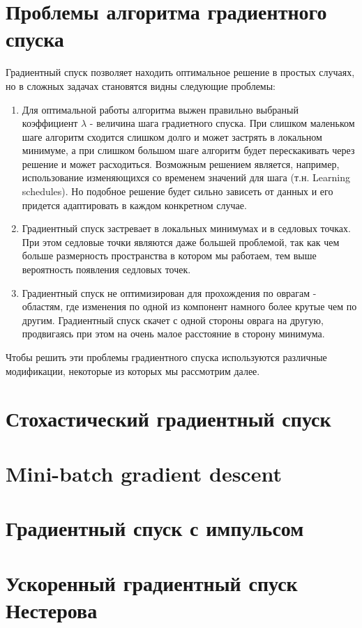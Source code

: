 \documentclass[12pt]{report}
\begin{document}
  \section{Проблемы алгоритма градиентного спуска}
  Градиентный спуск позволяет находить оптимальное решение в простых случаях, но
  в сложных задачах становятся видны следующие проблемы:
  \begin{enumerate}
    \item
    Для оптимальной работы алгоритма выжен правильно выбраный коэффициент $\lambda$
    - величина шага градиетного спуска. При слишком маленьком шаге алгоритм
    сходится слишком долго и может застрять в локальном минимуме, а при слишком
    большом шаге алгоритм будет перескакивать через решение и может расходиться.
    Возможным решением является, например, использование изменяющихся со временем
    значений для шага (т.н. Learning schedules). Но подобное решение будет
    сильно зависеть от данных и его придется адаптировать в каждом конкретном случае.
    \item
    Градиентный спуск застревает в локальных минимумах и в седловых точках.
    При этом седловые точки являются даже большей проблемой, так как чем больше
    размерность пространства в котором мы работаем, тем выше вероятность
    появления седловых точек.
    \item
    Градиентный спуск не оптимизирован для прохождения по оврагам - областям, где
    изменения по одной из компонент намного более крутые чем по другим.
    Градиентный спуск скачет с одной стороны оврага на другую, продвигаясь при
    этом на очень малое расстояние в сторону минимума.
  \end{enumerate}
  Чтобы решить эти проблемы градиентного спуска используются различные модификации,
  некоторые из которых мы рассмотрим далее.

  \section{Стохастический градиентный спуск}
  \section{Mini-batch gradient descent}
  \section{Градиентный спуск с импульсом}
  \section{Ускоренный градиентный спуск Нестерова}
\end{document}
